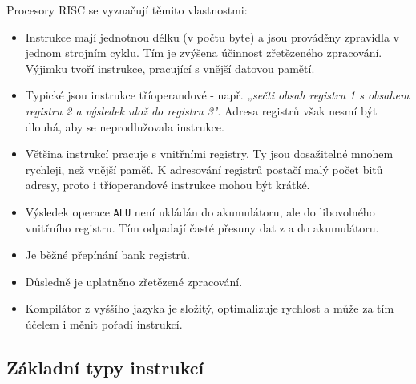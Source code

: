       Procesory RISC se vyznačují těmito vlastnostmi:
      \begin{itemize}[noitemsep]
        \item Instrukce mají jednotnou délku (v počtu byte) a jsou prováděny zpravidla v jednom   
              strojním cyklu. Tím je zvýšena účinnost zřetězeného zpracování. Výjimku tvoří 
              instrukce, pracující s vnější datovou pamětí.        
        \item Typické jsou instrukce tříoperandové - např. \emph{„sečti obsah registru 1 s obsahem  
              registru 2 a výsledek ulož do registru 3"}. Adresa registrů však nesmí být dlouhá, 
              aby se neprodlužovala instrukce.
        \item Většina instrukcí pracuje s vnitřními registry. Ty jsou dosažitelné mnohem rychleji,  
              než vnější paměť. K adresování registrů postačí malý počet bitů adresy, proto i 
              tříoperandové instrukce mohou být krátké.        
        \item Výsledek operace \texttt{ALU} není ukládán do akumulátoru, ale do libovolného    
              vnitřního registru. Tím odpadají časté přesuny dat z a do akumulátoru.
        \item Je běžné přepínání bank registrů.        
        \item Důsledně je uplatněno zřetězené zpracování.        
        \item Kompilátor z vyššího jazyka je složitý, optimalizuje rychlost a může za tím účelem i  
              měnit pořadí instrukcí.       
      \end{itemize}
    
    \subsection{Základní typy instrukcí}\label{ces:IchapIVsecIIssecV}
